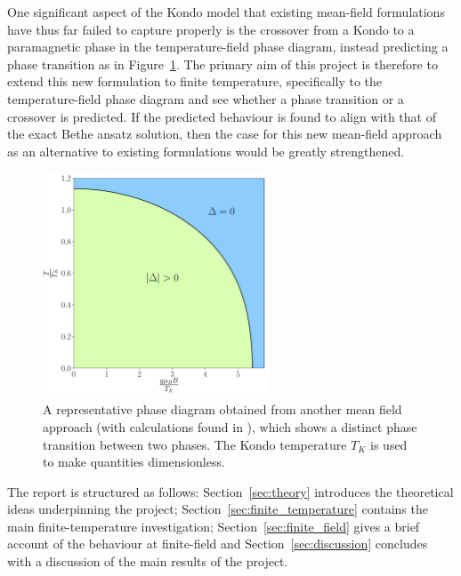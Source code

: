 \documentclass[12pt]{article}
\begin{document}
One significant aspect of the Kondo model that existing mean-field formulations have thus far failed to capture properly is the crossover from a Kondo to a paramagnetic phase in the temperature-field phase diagram, instead predicting a phase transition as in Figure~\ref{fig:phase_diagram}. The primary aim of this project is therefore to extend this new formulation to finite temperature, specifically to the temperature-field phase diagram and see whether a phase transition or a crossover is predicted. If the predicted behaviour is found to align with that of the exact Bethe ansatz solution, then the case for this new mean-field approach as an alternative to existing formulations would be greatly strengthened.

\begin{figure}[ht]
  \centering
  \includegraphics[width=0.6\textwidth]{Figures/phase_diagram.pdf}
  \caption{A representative phase diagram obtained from another mean field approach (with calculations found in \cite{ManyBodyPhysics}), which shows a distinct phase transition between two phases. The Kondo temperature $ T_K $ is used to make quantities dimensionless.}
  \label{fig:phase_diagram}
\end{figure}

The report is structured as follows: Section~\ref{sec:theory} introduces the theoretical ideas underpinning the project; Section~\ref{sec:finite_temperature} contains the main finite-temperature investigation; Section~\ref{sec:finite_field} gives a brief account of the behaviour at finite-field and Section~\ref{sec:discussion} concludes with a discussion of the main results of the project.


\end{document}
